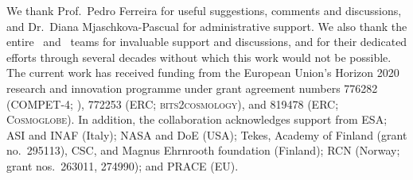 \begin{acknowledgements}
  We thank Prof.\ Pedro Ferreira for useful suggestions, comments and
  discussions, and Dr.\ Diana Mjaschkova-Pascual for administrative
  support. We also thank the entire \Planck\ and \WMAP\ teams for
  invaluable support and discussions, and for their dedicated efforts
  through several decades without which this work would not be
  possible. The current work has received funding from the European
  Union’s Horizon 2020 research and innovation programme under grant
  agreement numbers 776282 (COMPET-4; \BP), 772253 (ERC;
  \textsc{bits2cosmology}), and 819478 (ERC; \textsc{Cosmoglobe}). In
  addition, the collaboration acknowledges support from ESA; ASI and
  INAF (Italy); NASA and DoE (USA); Tekes, Academy of Finland (grant
   no.\ 295113), CSC, and Magnus Ehrnrooth foundation (Finland); RCN
  (Norway; grant nos.\ 263011, 274990); and PRACE (EU).
\end{acknowledgements}

